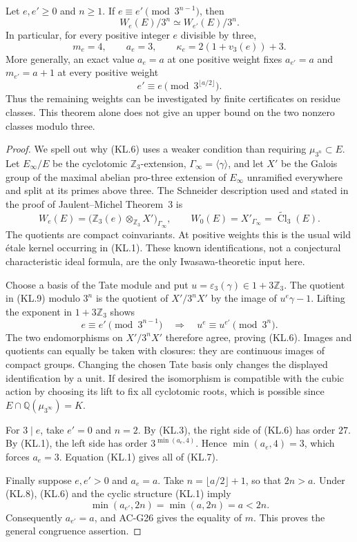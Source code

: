 \begin{theorem}
\label{AC-K14}
Let $e,e'\geq0$ and $n\geq1$.  If
$e\equiv e'\pmod{3^{n-1}}$, then
\[
                   W_e(E)/3^n\simeq W_{e'}(E)/3^n.    \tag{KL.6}
\]
In particular, for every positive integer $e$ divisible by three,
\[
 \boxed{m_e=4,\qquad a_e=3,\qquad
        \kappa_e=2(1+v_3(e))+3.}                     \tag{KL.7}
\]
More generally, an exact value $a_e=a$ at one positive weight
fixes $a_{e'}=a$ and $m_{e'}=a+1$ at every positive weight
\[
                    e'\equiv e\pmod{3^{\lfloor a/2\rfloor}}.
                                                               \tag{KL.8}
\]
Thus the remaining weights can be investigated by finite
certificates on residue classes.  This theorem alone does not
give an upper bound on the two nonzero classes modulo three.
\end{theorem}
\begin{proof}
We spell out why (KL.6) uses a weaker condition than requiring
$\mu_{3^n}\subset E$.  Let $E_\infty/E$ be the cyclotomic
$\mathbb Z_3$-extension, $\Gamma_\infty=\langle\gamma\rangle$,
and let $X'$ be the Galois group of the maximal abelian pro-three
extension of $E_\infty$ unramified everywhere and split at
its primes above three.  The Schneider description used and
stated in the proof of Jaulent--Michel Theorem~3 is
\[
 W_e(E)=\bigl(\mathbb Z_3(e)\otimes_{\mathbb Z_3}X'\bigr)
                   _{\Gamma_\infty},
 \qquad
 W_0(E)=X'_{\Gamma_\infty}
             =\widetilde{\operatorname{Cl}}_3(E).    \tag{KL.9}
\]
The quotients are compact coinvariants.  At positive weights
this is the usual wild \'etale kernel occurring in (KL.1).
These known identifications, not a conjectural characteristic
ideal formula, are the only Iwasawa-theoretic input here.

Choose a basis of the Tate module and put
$u=\varepsilon_3(\gamma)\in1+3\mathbb Z_3$.
The quotient in (KL.9) modulo $3^n$ is the quotient of
$X'/3^nX'$ by the image of $u^e\gamma-1$.
Lifting the exponent in $1+3\mathbb Z_3$ shows
\[
 e\equiv e'\pmod{3^{n-1}}
       \quad\Longrightarrow\quad
                    u^e\equiv u^{e'}\pmod{3^n}.
\]
The two endomorphisms on $X'/3^nX'$ therefore agree, proving
(KL.6).  Images and quotients can equally be taken with closures:
they are continuous images of compact groups.  Changing the
chosen Tate basis only changes the displayed identification by
a unit.  If desired the isomorphism is compatible with the
cubic action by choosing its lift to fix all cyclotomic roots,
which is possible since $E\cap\mathbb Q(\mu_{3^\infty})=K$.

For $3\mid e$, take $e'=0$ and $n=2$.
By (KL.3), the right side of (KL.6) has order $27$.
By (KL.1), the left side has order
$3^{\min(a_e,4)}$.  Hence
$\min(a_e,4)=3$, which forces $a_e=3$.
Equation (KL.1) gives all of (KL.7).

Finally suppose $e,e'>0$ and $a_e=a$.
Take $n=\lfloor a/2\rfloor+1$, so that $2n>a$.
Under (KL.8), (KL.6) and the cyclic structure (KL.1) imply
\[
            \min(a_{e'},2n)=\min(a,2n)=a<2n.
\]
Consequently $a_{e'}=a$, and AC-G26 gives the equality of $m$.
This proves the general congruence assertion.
\end{proof}

